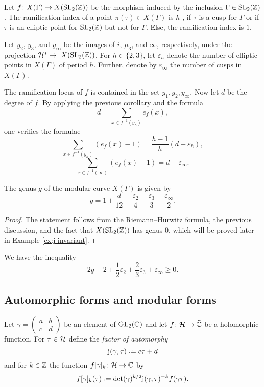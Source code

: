 \begin{cor}
 Let $f\colon X(\Gamma)\to X(\operatorname{SL}_2(\mathbb{Z}))$ be the morphism induced by the inclusion $\Gamma\in\operatorname{SL}_2(\mathbb{Z})$. The ramification index of a point $\pi(\tau)\in X(\Gamma)$ is $h_\tau$, if $\tau$ is a cusp for $\Gamma$ or if $\tau$ is an elliptic point for $\operatorname{SL}_2(\mathbb{Z})$ but not for $\Gamma$. Else, the ramification index is $1$.
\end{cor}

Let $y_2$, $y_3$, and $y_\infty$ be the images of $i$, $\mu_3$, and $\infty$, respectively, under the projection $\mathcal{H}^*\to\ X(\operatorname{SL}_2(\mathbb{Z}))$. For $h\in\{2,3\}$, let $\varepsilon_h$ denote the number of elliptic points in $X(\Gamma)$ of period $h$. Further, denote by $\varepsilon_\infty$ the number of cusps in $X(\Gamma)$.

The ramification locus of $f$ is contained in the set ${y_1,y_2,y_\infty}$. Now let $d$ be the degree of $f$. By applying the previous corollary and the formula 
\[d=\sum_{x\in f^{-1}(y_h)}e_f(x),\] one verifies the formulae
\[\sum_{x\in f^{-1}(y_h)}(e_f(x)-1)=\frac{h-1}{h}(d-\varepsilon_h),\]
\[\sum_{x\in f^{-1}(\infty)}(e_f(x)-1)=d-\varepsilon_\infty.\]

\begin{prop}
 The genus $g$ of the modular curve $X(\Gamma)$ is given by
 \[g=1+\frac{d}{12}-\frac{\varepsilon_2}{4}-\frac{\varepsilon_3}{3}-\frac{\varepsilon_\infty}{2}.\]
\end{prop}

\begin{proof}
 The statement follows from the Riemann--Hurwitz formula, the previous discussion, and the fact that $X(\operatorname{SL}_2(\mathbb{Z}))$ has genus $0$, which will be proved later in Example \ref{ex:j-invariant}.
\end{proof}

\begin{cor} \label{pr:inequality}
 We have the inequality \[2g-2+\frac{1}{2}\varepsilon_2+\frac{2}{3}\varepsilon_3+\varepsilon_\infty\geq0.\]
\end{cor}

\subsection{Automorphic forms and modular forms}

\begin{defi}
 Let $\gamma = \left(\begin{smallmatrix}a & b \\ c & d\end{smallmatrix}\right)$ be an element of $\operatorname{GL}_2(\mathbb{C})$ and let $f\colon\mathcal{H}\to\widehat{\mathbb{C}}$ be a holomorphic function. For $\tau\in\mathcal{H}$ define the \emph{factor of automorphy}
 \[\mathrm{j}(\gamma,\tau)\defeq c\tau+d\]
 and for $k\in \mathbb{Z}$ the function $f[\gamma]_k\colon\mathcal{H}\to\mathbb{C}$ by
 \[f[\gamma]_k(\tau) \defeq \det(\gamma)^{k/2}\jrm(\gamma,\tau)^{-k}f(\gamma\tau).\]
\end{defi}

